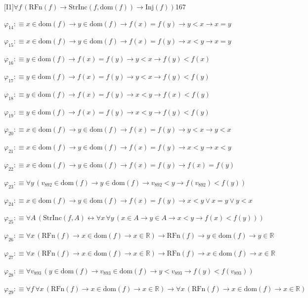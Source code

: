 \begin{fullproof}{[I1]}{$\forall f\,(\mathrm{RFn}(f) \to \mathrm{StrInc}(f,\mathrm{dom}(f)) \to \mathrm{Inj}(f))$}{167}
\begin{abbrevlist}
\item $\varphi_{14} :\equiv x \in \mathrm{dom}(f) \to y \in \mathrm{dom}(f) \to f(x) = f(y) \to y < x \to x = y$
\item $\varphi_{15} :\equiv x \in \mathrm{dom}(f) \to y \in \mathrm{dom}(f) \to f(x) = f(y) \to x < y \to x = y$
\item $\varphi_{16} :\equiv y \in \mathrm{dom}(f) \to f(x) = f(y) \to y < x \to f(y) < f(x)$
\item $\varphi_{17} :\equiv y \in \mathrm{dom}(f) \to f(x) = f(y) \to y < x \to f(y) < f(y)$
\item $\varphi_{18} :\equiv y \in \mathrm{dom}(f) \to f(x) = f(y) \to x < y \to f(x) < f(y)$
\item $\varphi_{19} :\equiv y \in \mathrm{dom}(f) \to f(x) = f(y) \to x < y \to f(y) < f(y)$
\item $\varphi_{20} :\equiv x \in \mathrm{dom}(f) \to y \in \mathrm{dom}(f) \to f(x) = f(y) \to y < x \to y < x$
\item $\varphi_{21} :\equiv x \in \mathrm{dom}(f) \to y \in \mathrm{dom}(f) \to f(x) = f(y) \to x < y \to x < y$
\item $\varphi_{22} :\equiv x \in \mathrm{dom}(f) \to y \in \mathrm{dom}(f) \to f(x) = f(y) \to f(x) = f(y)$
\item $\varphi_{23} :\equiv \forall y\,(v_{892} \in \mathrm{dom}(f) \to y \in \mathrm{dom}(f) \to v_{892} < y \to f(v_{892}) < f(y))$
\item $\varphi_{24} :\equiv x \in \mathrm{dom}(f) \to y \in \mathrm{dom}(f) \to f(x) = f(y) \to x < y \lor x = y \lor y < x$
\item $\varphi_{25} :\equiv \forall A\,(\mathrm{StrInc}(f,A) \leftrightarrow \forall x\,\forall y\,(x \in A \to y \in A \to x < y \to f(x) < f(y)))$
\item $\varphi_{26} :\equiv \forall x\,(\mathrm{RFn}(f) \to x \in \mathrm{dom}(f) \to x \in \mathbb{R}) \to \mathrm{RFn}(f) \to y \in \mathrm{dom}(f) \to y \in \mathbb{R}$
\item $\varphi_{27} :\equiv \forall x\,(\mathrm{RFn}(f) \to x \in \mathrm{dom}(f) \to x \in \mathbb{R}) \to \mathrm{RFn}(f) \to x \in \mathrm{dom}(f) \to x \in \mathbb{R}$
\item $\varphi_{28} :\equiv \forall v_{893}\,(y \in \mathrm{dom}(f) \to v_{893} \in \mathrm{dom}(f) \to y < v_{893} \to f(y) < f(v_{893}))$
\item $\varphi_{29} :\equiv \forall f\,\forall x\,(\mathrm{RFn}(f) \to x \in \mathrm{dom}(f) \to x \in \mathbb{R}) \to \forall x\,(\mathrm{RFn}(f) \to x \in \mathrm{dom}(f) \to x \in \mathbb{R})$

\end{abbrevlist}
\end{fullproof}
